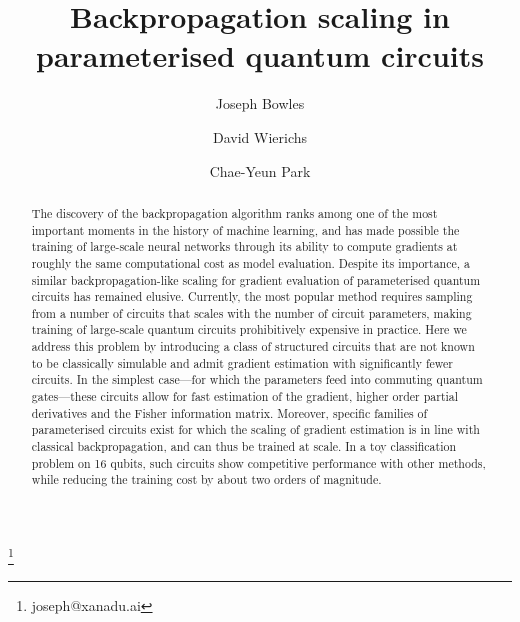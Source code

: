 \documentclass[a4paper,twocolumn,11pt,accepted=2025-09-06]{quantumarticle}
\begin{document}
\title{Backpropagation scaling in parameterised quantum circuits}


\author{Joseph Bowles}\thanks{joseph@xanadu.ai}
\author{David Wierichs}
\author{Chae-Yeun Park}





\begin{abstract}
    The discovery of the backpropagation algorithm ranks among one of the most important moments in the history of machine learning, and has made possible the training of large-scale neural networks through its ability to compute gradients at roughly the same computational cost as model evaluation. Despite its importance, a similar backpropagation-like scaling for gradient evaluation of parameterised quantum circuits has remained elusive. Currently, the most popular method requires sampling from a number of circuits that scales with the number of circuit parameters,
    making training of large-scale quantum circuits prohibitively expensive in practice. Here we address this problem by introducing a class of structured circuits that are not known to be classically simulable and admit gradient estimation with significantly fewer circuits. 
    In the simplest case---for which the parameters feed into commuting quantum gates---these circuits allow for fast estimation of the gradient, higher order partial derivatives and the Fisher information matrix. Moreover, specific families of parameterised circuits exist for which the scaling of gradient estimation is in line with classical backpropagation, and can thus be trained at scale.
    In a toy classification problem on 16 qubits, such circuits show competitive performance with other methods, while reducing the training cost by about two orders of magnitude.



\end{abstract}
\end{document}
